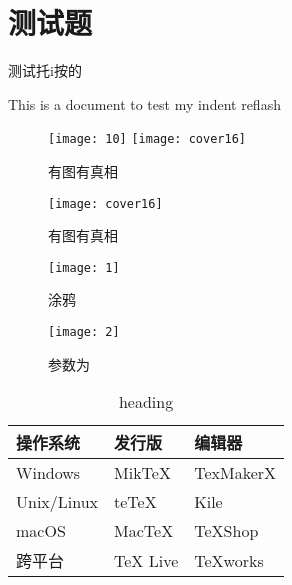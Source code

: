 \chapter{测试题}
测试托i按的

This is a document to test my indent reflash


\begin{figure}[htbp]
     \centering
     \texttt{[image: 10]}
     \hspace*{2cm}
     \texttt{[image: cover16]}
     \caption{有图有真相}
     \label{fig:myphoto}
\end{figure}

\begin{figure}[htbp]
     \centering
     \texttt{[image: cover16]}
     \caption{有图有真相}
     \label{fig:myphoto}
\end{figure}






     \begin{figure}[htbp]
         \centering
         \begin{minipage}{0.45\textwidth}
             \centering
             \texttt{[image: 1]}
             \caption{涂鸦}
             \label{fig2}
         \end{minipage}
         \begin{minipage}{0.45\textwidth}
             \centering
             \texttt{[image: 2]}
             \caption{参数为}
             \label{fig3}
         \end{minipage}
     \end{figure}





     \begin{table}[htbp]
          \renewcommand{\arraystretch}{1.5}
          \centering
          \caption{heading}
          \begin{tabular}{|>{\centering\arraybackslash}p{5cm}|p{3cm}|p{2cm}|}
               \hline
               操作系统& 发行版& 编辑器\\
               \hline
               Windows & MikTeX & TexMakerX \\
               Unix/Linux & teTeX & Kile \\
               macOS & MacTeX & TeXShop \\
               跨平台& TeX Live & TeXworks \\
               \hline
          \end{tabular}
     \end{table}



